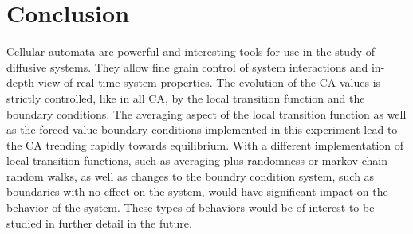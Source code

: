 \documentclass[11pt,twocolumn]{article}
\begin{document}
\vspace{5mm}

\section{Conclusion}
Cellular automata are powerful and interesting tools for use in the study of diffusive systems. They allow fine grain control of system interactions and in-depth view of real time system properties\cite{weimar}. The evolution of the CA values is strictly controlled, like in all CA, by the local transition function and the boundary conditions\cite{wolfram94}. The averaging aspect of the local transition function as well as the forced value boundary conditions implemented in this experiment lead to the CA trending rapidly towards equilibrium. 
With a different implementation of local transition functions, such as averaging plus randomness\cite{yang01} or markov chain random walks, as well as 
changes to the boundry condition system, such as boundaries with no effect on the system, would have significant impact on the behavior of the system. 
These types of behaviors would be of interest to be studied in further detail in the future.
\end{document}
